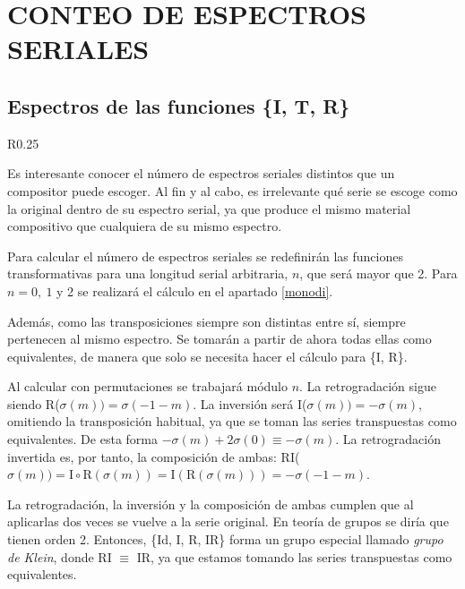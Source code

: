 	\chapter{CONTEO DE ESPECTROS SERIALES}
	\section{Espectros de las funciones \{I, T, R\}}
		\label{espec}		
		
		\begin{wrapfigure}{R}{0.25\textwidth}
			\captionsetup{justification=centering, font=footnotesize}
			\vspace*{-\bigskipamount}
			
			\vspace*{-\bigskipamount}
		\end{wrapfigure}
		Es interesante conocer el número de espectros seriales distintos que un compositor puede escoger. Al fin y al cabo, es irrelevante qué serie se escoge como la original dentro de su espectro serial, ya que produce el mismo material compositivo que cualquiera de su mismo espectro.
		
		Para calcular el número de espectros seriales se redefinirán las funciones transformativas para una longitud serial arbitraria, $n$, que será mayor que 2. Para $n=0,\ 1$ y 2 se realizará el cálculo en el apartado \ref{monodi}. 
	
		Además, como las transposiciones siempre son distintas entre sí, siempre pertenecen al mismo espectro. Se tomarán a partir de ahora todas ellas como equivalentes, de manera que solo se necesita hacer el cálculo para \{I, R\}.
		
		Al calcular con permutaciones se trabajará módulo $n$. La retrogradación sigue siendo R($\sigma(m))=\sigma(-1-m)$. La inversión será I($\sigma(m))=-\sigma(m)$, omitiendo la transposición habitual, ya que se toman las series transpuestas como equivalentes. De esta forma $-\sigma(m)+2\sigma(0)\equiv-\sigma(m)$. La retrogradación invertida es, por tanto, la composición de ambas: RI($\sigma(m))=\text{I}\circ\text{R}(\sigma(m))=\text{I}\left(\text{R}(\sigma(m))\right)=-\sigma(-1-m)$.
		
		La retrogradación, la inversión y la composición de ambas cumplen que al aplicarlas dos veces se vuelve a la serie original. En teoría de grupos se diría que tienen orden 2. Entonces, \{Id, I, R, IR\} forma un grupo especial llamado \textit{grupo de Klein}, donde RI $\equiv$ IR, ya que estamos tomando las series transpuestas como equivalentes. 
		
